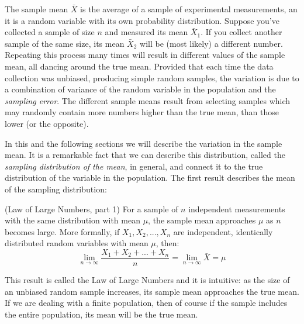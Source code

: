 \documentclass[
  letterpaper,
  DIV=11,
  numbers=noendperiod]{scrreprt}
\begin{document}
The sample mean \(\bar X\) is the average of a sample of experimental
measurements, an it is a random variable with its own probability
distribution. Suppose you've collected a sample of size \(n\) and
measured its mean \(\bar X_1\). If you collect another sample of the
same size, its mean \(\bar X_2\) will be (most likely) a different
number. Repeating this process many times will result in different
values of the sample mean, all dancing around the true mean. Provided
that each time the data collection was unbiased, producing simple random
samples, the variation is due to a combination of variance of the random
variable in the population and the \emph{sampling error}. The different
sample means result from selecting samples which may randomly contain
more numbers higher than the true mean, than those lower (or the
opposite).

In this and the following sections we will describe the variation in the
sample mean. It is a remarkable fact that we can describe this
distribution, called the \emph{sampling distribution of the mean}, in
general, and connect it to the true distribution of the variable in the
population. The first result describes the mean of the sampling
distribution:

\begin{tcolorbox}[enhanced jigsaw, coltitle=black, arc=.35mm, opacitybacktitle=0.6, breakable, bottomtitle=1mm, toptitle=1mm, titlerule=0mm, colback=white, leftrule=.75mm, rightrule=.15mm, colframe=quarto-callout-important-color-frame, colbacktitle=quarto-callout-important-color!10!white, opacityback=0, title=\textcolor{quarto-callout-important-color}{\faExclamation}\hspace{0.5em}{Theorem}, left=2mm, toprule=.15mm, bottomrule=.15mm]

(Law of Large Numbers, part 1) For a sample of \(n\)
independent measurements with the same
distribution with mean \(\mu\), the sample mean approaches \(\mu\) as
\(n\) becomes large. More formally, if \(X_1, X_2, ... , X_n\) are
independent, identically distributed random variables with mean \(\mu\),
then:
\[ \lim_{n \rightarrow \infty}  \frac{X_1 + X_2 + ... + X_n} {n} =  \lim_{n \rightarrow \infty}  \bar X = \mu \]

\end{tcolorbox}

This result is called the Law of Large Numbers and it is intuitive: as
the size of an unbiased random sample increases, its sample mean
approaches the true mean. If we are dealing with a finite population,
then of course if the sample includes the entire population, its mean
will be the true mean.
\end{document}
